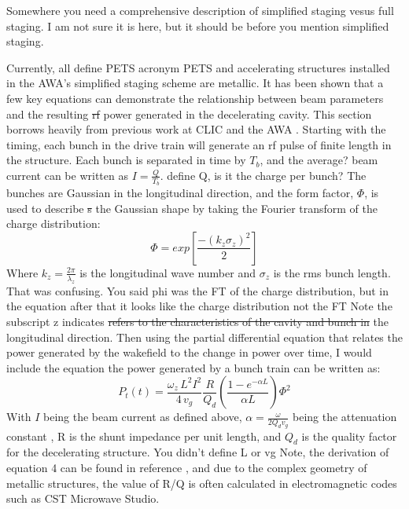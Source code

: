 \documentclass{iitthesis}
\newcommand{\lsnote}[1]{\textsf{{\color{violet}{ LS note:}   #1 }}}
\begin{document}


\lsnote{Somewhere you need a comprehensive description of simplified staging vesus full staging.  I am not sure it is here, but it should be before you mention simplified staging.}

Currently, all \lsnote{define PETS acronym} PETS and accelerating structures installed in the AWA's
simplified staging scheme are metallic. It has been shown that a few
key equations can demonstrate the relationship between beam parameters
and the resulting \lsnote{\sout{rf} power} generated in the decelerating cavity. This section
borrows heavily from previous work at CLIC and the AWA \cite{key-3,key-8}. 
Starting with the timing, each bunch in the drive train will generate
an rf pulse of finite length in the structure. Each bunch is separated
in time by $T_{b}$, and the \lsnote{average?} beam current can be written as $I=\frac{Q}{T_{b}}$.
\lsnote{define Q, is it the charge per bunch?} The bunches are Gaussian in the longitudinal direction, and the form
factor, $\Phi$, is used to describe\lsnote{\sout{s}} the Gaussian shape by taking
the Fourier transform of the charge distribution: 
\begin{equation}
\Phi=exp\left[\frac{-(k_{z}\sigma_{z})^{2}}{2}\right]
\end{equation}
Where $k_{z}=\frac{2\pi}{\lambda_{z}}$ is the longitudinal wave number
and $\sigma_{z}$ is the rms bunch length. \lsnote{That was confusing.  You said phi was the FT of the charge distribution, but in the equation after that it looks like the charge distribution not the FT}  Note the subscript z \lsnote{indicates \sout{refers to the characteristics of the cavity and bunch in}} the longitudinal
direction. Then using the partial differential equation that relates
the power generated by the wakefield to the change in power over time, \lsnote{I would include the equation}
the power generated by a bunch train can be written as:
\begin{equation} \label{eq:rfpower}
P_{t}(t)=\frac{\omega_{z}\,L^{2}I^{2}}{4\,v_{g}}\frac{R}{Q_{d}}\left(\frac{1-e^{-\alpha L}}{\alpha L}\right)\Phi^{2}
\end{equation}
With $I$ being the beam current as defined above, $\alpha=\frac{\omega}{2Q_{d}v_{g}}$
being the attenuation constant \cite{key-9}, R is the shunt impedance
per unit length, and $Q_{d}$ is the quality factor for the decelerating
structure. \lsnote{You didn't define L or vg} Note, the derivation of equation 4 can be found in reference
\cite{key-8}, and due to the complex geometry of metallic structures,
the value of R/Q is often calculated in electromagnetic codes such
as CST Microwave Studio. 
\end{document}
